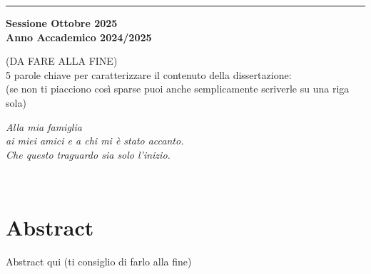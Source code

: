\documentclass[12pt,a4paper,twoside]{book}
\begin{document}
\begin{titlepage}
\vspace{30mm}

\rule[0.5cm]{15.8cm}{0.6mm}

\begin{center}
{\large{\bf Sessione Ottobre 2025 \\}}
{\large{\bf Anno Accademico 2024/2025\\}}
\end{center}

\end{titlepage}

\restoregeometry
\newpage
\begin{center}
    (DA FARE ALLA FINE)\\
    5 parole chiave per caratterizzare il contenuto della dissertazione:\\ (se non ti piacciono così sparse puoi anche semplicamente scriverle su una riga sola)
\end{center}

\newpage

\topmargin=6.5cm
\begin{flushright}
\emph{
\LARGE{Alla mia famiglia}\\\vspace{2mm}
\LARGE{ai miei amici e a chi mi è stato accanto.}\\\vspace{3mm} 
\LARGE{Che questo traguardo sia solo l'inizio.} 
}
\end{flushright}
\newpage~\newpage
{}
\chapter*{Abstract}
Abstract qui (ti consiglio di farlo alla fine)

\topmargin=-1cm
\tableofcontents
\thispagestyle{empty}
\listoftables
\thispagestyle{empty}
\listoffigures
\thispagestyle{empty}
\newpage~\newpage
\end{document}
